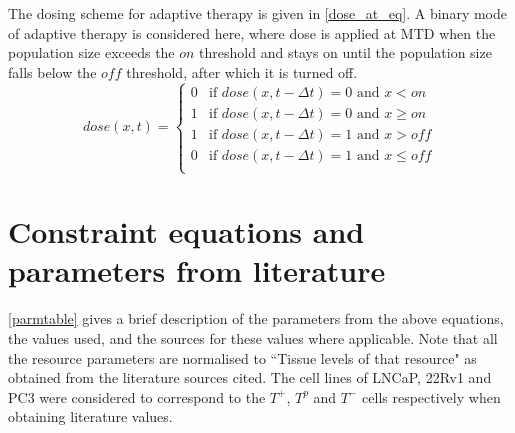 The dosing scheme for adaptive therapy is given in \autoref{dose_at_eq}. A binary mode of adaptive therapy is considered here, where dose is applied at MTD when the population size exceeds the $on$ threshold and stays on until the population size falls below the $off$ threshold, after which it is turned off.
\begin{equation}
  dose(x,t) = \begin{cases}
  0 &\text{if } dose(x,t-\Delta t) = 0 \text{ and } x < on\\
  1 &\text{if } dose(x,t-\Delta t) = 0 \text{ and } x \geq on \\
  1 &\text{if } dose(x,t-\Delta t) = 1 \text{ and } x > off \\
  0 &\text{if } dose(x,t-\Delta t) = 1 \text{ and } x \leq off \\
  \end{cases}
  \label{dose_at_eq}
\end{equation}

\section{Constraint equations and parameters from literature}
\autoref{parmtable} gives a brief description of the parameters from the above equations, the values used, and the sources for these values where applicable. Note that all the resource parameters are normalised to ``Tissue levels of that resource" as obtained from the literature sources cited. The cell lines of LNCaP, 22Rv1 and PC3 were considered to correspond to the $T^+$, $T^p$ and $T^-$ cells respectively when obtaining literature values.

